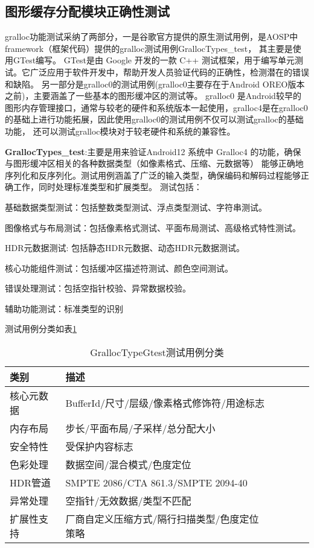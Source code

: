 \subsection{图形缓存分配模块正确性测试}
gralloc功能测试采纳了两部分，一是谷歌官方提供的原生测试用例，是AOSP中framework（框架代码）提供的gralloc测试用例GrallocTypes\_test，
其主要是使用GTest编写。
GTest\cite{GoogleTest}是由 Google 开发的一款 C++ 测试框架，用于编写单元测试。它广泛应用于软件开发中，帮助开发人员验证代码的正确性，检测潜在的错误和缺陷。
另一部分是gralloc0的测试用例(gralloc0主要存在于Android OREO版本之前)，主要涵盖了一些基本的图形缓冲区的测试等。
gralloc0 是Android较早的图形内存管理接口，通常与较老的硬件和系统版本一起使用，gralloc4是在gralloc0的基础上进行功能拓展，因此使用gralloc0的测试用例不仅可以测试gralloc的基础功能，
还可以测试gralloc模块对于较老硬件和系统的兼容性。

\textbf{GrallocTypes\_test}:主要是用来验证Android12 系统中 Gralloc4 的功能，确保与图形缓冲区相关的各种数据类型（如像素格式、压缩、元数据等）
能够正确地序列化和反序列化。测试用例涵盖了广泛的输入类型，确保编码和解码过程能够正确工作，同时处理标准类型和扩展类型。
测试包括：

    基础数据类型测试：包括整数类型测试、浮点类型测试、字符串测试。

    图像格式与布局测试：包括像素格式测试、平面布局测试、高级格式特性测试。

    HDR元数据测试: 包括静态HDR元数据、动态HDR元数据测试。

    核心功能组件测试：包括缓冲区描述符测试、颜色空间测试。

    错误处理测试：包括空指针校验、异常数据校验。
    
    辅助功能测试：标准类型的识别

测试用例分类如表\ref{tab:GrallocTypeGtest测试用例分类}

\begin{table}[H]
    \centering
    \caption{GrallocTypeGtest测试用例分类}
    \label{tab:GrallocTypeGtest测试用例分类}
    \begin{tabular}{llllll}
      \toprule
      类别 & 描述  \\
      \midrule
      核心元数据 & BufferId/尺寸/层级/像素格式修饰符/用途标志  \\
      内存布局 & 步长/平面布局/子采样/总分配大小 \\
      安全特性 & 受保护内容标志 \\
      色彩处理 & 数据空间/混合模式/色度定位 \\
      HDR管道 & SMPTE 2086/CTA 861.3/SMPTE 2094-40 \\
      异常处理 & 空指针/无效数据/类型不匹配 \\
      扩展性支持 & 厂商自定义压缩方式/隔行扫描类型/色度定位策略 \\
      \bottomrule
    \end{tabular}
    \note{}
\end{table}

